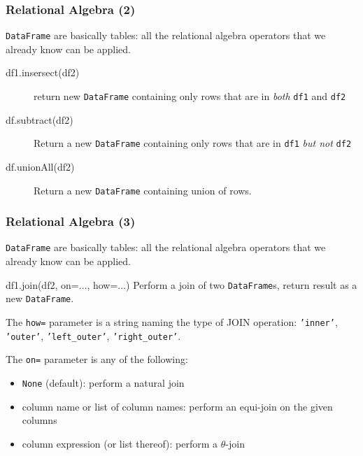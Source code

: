 \documentclass[english,serif,mathserif]{beamer}
\begin{document}
\begin{frame}
  \frametitle{Relational Algebra (2)}
  \texttt{DataFrame} are basically tables: all the relational algebra operators
  that we already know can be applied.

  \+
  \begin{description}
  \item[df1.insersect(df2)] return new \texttt{DataFrame} containing only rows
    that are in \emph{both} \texttt{df1} and \texttt{df2}
  \item[df.subtract(df2)] Return a new \texttt{DataFrame} containing only rows
    that are in \texttt{df1} \emph{but not} \texttt{df2}
  \item[df.unionAll(df2)] Return a new \texttt{DataFrame} containing union of rows.
  \end{description}
\end{frame}


\begin{frame}[fragile]
  \frametitle{Relational Algebra (3)}
  \smaller

  \texttt{DataFrame} are basically tables: all the relational algebra operators
  that we already know can be applied.

  \+
  \begin{describe}{df1.join(df2, on=$\ldots$, how=$\ldots$)}
    Perform a join of two \texttt{DataFrame}s, return result as a new \texttt{DataFrame}.

    \+
    The \texttt{how=} parameter is a string naming the type of JOIN operation:
    \texttt{'inner'}, \texttt{'outer'}, \texttt{'left\_outer'},
    \texttt{'right\_outer'}.

    \+
    The \texttt{on=} parameter is any of the following:
    \begin{itemize}
    \item \texttt{None} (default): perform a natural join
    \item column name or list of column names: perform an equi-join on the given
      columns
    \item column expression (or list thereof): perform a $\theta$-join
    \end{itemize}
  \end{describe}
\end{frame}
\end{document}
